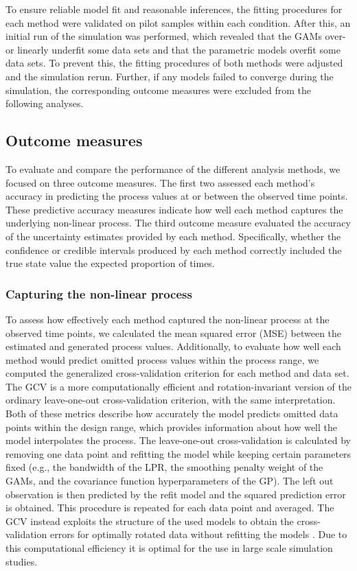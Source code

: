 \documentclass[man, floatsintext]{apa7}
\begin{document}
To ensure reliable model fit and reasonable inferences, the fitting procedures
for each method were validated on pilot samples within each condition. After
this, an initial run of the simulation was performed, which revealed that the
GAMs over- or linearly underfit some data sets and that the parametric models
overfit some data sets. To prevent this, the fitting procedures of both methods
were adjusted and the simulation rerun. Further, if any models failed to
converge during the simulation, the corresponding outcome measures were
excluded from the following analyses.

\subsection{Outcome measures}

To evaluate and compare the performance of the different analysis methods, we
focused on three outcome measures. The first two assessed each method's
accuracy in predicting the process values at or between the observed time
points. These predictive accuracy measures indicate how well each method
captures the underlying non-linear process. The third outcome measure evaluated
the accuracy of the uncertainty estimates provided by each method.
Specifically, whether the confidence or credible intervals produced by each
method correctly included the true state value the expected proportion of
times.

\subsubsection{Capturing the non-linear process}

To assess how effectively each method captured the non-linear process at the
observed time points, we calculated the mean squared error (MSE) between the
estimated and generated process values. Additionally, to evaluate how well each
method would predict omitted process values within the process range, we
computed the generalized cross-validation
\parencite[GCV;][]{golub_generalized_1979} criterion for each method and data
set. The GCV is a more computationally efficient and rotation-invariant version
of the ordinary leave-one-out cross-validation criterion, with the same
interpretation. Both of these metrics describe how accurately the model
predicts omitted data points within the design range, which provides
information about how well the model interpolates the process. The
leave-one-out cross-validation is calculated by removing one data point and
refitting the model while keeping certain parameters fixed (e.g., the bandwidth
of the LPR, the smoothing penalty weight of the GAMs, and the covariance
function hyperparameters of the GP). The left out observation is then predicted
by the refit model and the squared prediction error is obtained. This procedure
is repeated for each data point and averaged. The GCV instead exploits the
structure of the used models to obtain the cross-validation errors for
optimally
rotated data without refitting the models \parencite{golub_generalized_1979}.
Due to this computational efficiency it is optimal for the use in large scale
simulation studies.
\end{document}
